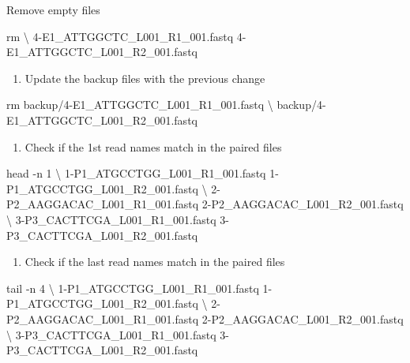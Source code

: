 \documentclass[
  letterpaper,
  DIV=11,
  numbers=noendperiod]{scrreprt}
\newenvironment{Shaded}{\begin{snugshade}}{\end{snugshade}}
\newcommand{\AttributeTok}[1]{\textcolor[rgb]{0.40,0.45,0.13}{#1}}
\newcommand{\DataTypeTok}[1]{\textcolor[rgb]{0.68,0.00,0.00}{#1}}
\newcommand{\FunctionTok}[1]{\textcolor[rgb]{0.28,0.35,0.67}{#1}}
\newcommand{\NormalTok}[1]{\textcolor[rgb]{0.00,0.23,0.31}{#1}}
\providecommand{\tightlist}{%
  \setlength{\itemsep}{0pt}\setlength{\parskip}{0pt}}
\begin{document}
Remove empty files

\begin{Shaded}
\begin{Highlighting}[]
\FunctionTok{rm} \DataTypeTok{\textbackslash{}}
\NormalTok{4{-}E1\_ATTGGCTC\_L001\_R1\_001.fastq 4{-}E1\_ATTGGCTC\_L001\_R2\_001.fastq}
\end{Highlighting}
\end{Shaded}

\begin{enumerate}
\def\labelenumi{\arabic{enumi}.}
\setcounter{enumi}{5}
\tightlist
\item
  Update the backup files with the previous change
\end{enumerate}

\begin{Shaded}
\begin{Highlighting}[]
\FunctionTok{rm}\NormalTok{ backup/4{-}E1\_ATTGGCTC\_L001\_R1\_001.fastq }\DataTypeTok{\textbackslash{}}
\NormalTok{backup/4{-}E1\_ATTGGCTC\_L001\_R2\_001.fastq }
\end{Highlighting}
\end{Shaded}

\begin{enumerate}
\def\labelenumi{\arabic{enumi}.}
\setcounter{enumi}{6}
\tightlist
\item
  Check if the 1st read names match in the paired files
\end{enumerate}

\begin{Shaded}
\begin{Highlighting}[]
\FunctionTok{head} \AttributeTok{{-}n}\NormalTok{ 1 }\DataTypeTok{\textbackslash{}}
\NormalTok{1{-}P1\_ATGCCTGG\_L001\_R1\_001.fastq 1{-}P1\_ATGCCTGG\_L001\_R2\_001.fastq }\DataTypeTok{\textbackslash{}}
\NormalTok{2{-}P2\_AAGGACAC\_L001\_R1\_001.fastq 2{-}P2\_AAGGACAC\_L001\_R2\_001.fastq }\DataTypeTok{\textbackslash{}}
\NormalTok{3{-}P3\_CACTTCGA\_L001\_R1\_001.fastq 3{-}P3\_CACTTCGA\_L001\_R2\_001.fastq }
\end{Highlighting}
\end{Shaded}

\begin{enumerate}
\def\labelenumi{\arabic{enumi}.}
\setcounter{enumi}{7}
\tightlist
\item
  Check if the last read names match in the paired files
\end{enumerate}

\begin{Shaded}
\begin{Highlighting}[]
\FunctionTok{tail} \AttributeTok{{-}n}\NormalTok{ 4 }\DataTypeTok{\textbackslash{}}
\NormalTok{1{-}P1\_ATGCCTGG\_L001\_R1\_001.fastq 1{-}P1\_ATGCCTGG\_L001\_R2\_001.fastq }\DataTypeTok{\textbackslash{}}
\NormalTok{2{-}P2\_AAGGACAC\_L001\_R1\_001.fastq 2{-}P2\_AAGGACAC\_L001\_R2\_001.fastq }\DataTypeTok{\textbackslash{}}
\NormalTok{3{-}P3\_CACTTCGA\_L001\_R1\_001.fastq 3{-}P3\_CACTTCGA\_L001\_R2\_001.fastq }
\end{Highlighting}
\end{Shaded}
\end{document}
